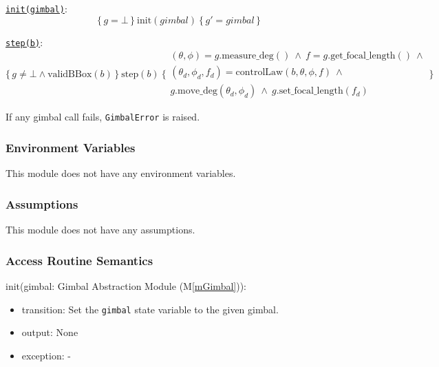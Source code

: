 \documentclass[12pt, titlepage]{article}
\newcommand{\mref}[1]{M\ref{#1}}
\begin{document}
\noindent\underline{\texttt{init(gimbal)}}:
\[
  \{\, g = \bot \,\}\ \text{init}(gimbal)\ \{\, g' = gimbal \,\}
\]

\noindent\underline{\texttt{step(b)}}:
\[
  \{\, g \neq \bot \land \text{validBBox}(b) \,\}\ \text{step}(b)\ \{
  \begin{array}{l}
    (\theta, \phi) = g.\text{measure\_deg}() \ \land\ f = g.\text{get\_focal\_length}() \ \land \\
    (\theta_d, \phi_d, f_d) = \text{controlLaw}(b, \theta, \phi, f) \ \land                     \\
    g.\text{move\_deg}(\theta_d, \phi_d)\ \land\ g.\text{set\_focal\_length}(f_d)
  \end{array}
  \}
\]

\noindent If any gimbal call fails, \texttt{GimbalError} is raised.

\subsubsection{Environment Variables}

This module does not have any environment variables.

\subsubsection{Assumptions}

This module does not have any assumptions.

\subsubsection{Access Routine Semantics}

\noindent init(gimbal: Gimbal Abstraction Module (\mref{mGimbal})):
\begin{itemize}
  \item transition: Set the \texttt{gimbal} state variable to the given gimbal.
  \item output: None
  \item exception: -
\end{itemize}
\end{document}
